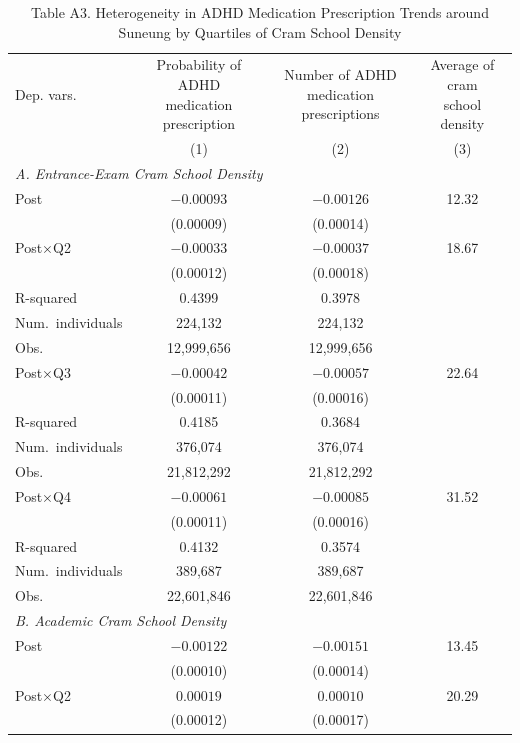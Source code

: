 \documentclass[12pt]{article}
\begin{document}
\clearpage
\begin{table}[H]
\centering
\caption{Table A3. Heterogeneity in ADHD Medication Prescription Trends around Suneung by Quartiles of Cram School Density}
\footnotesize\renewcommand{\arraystretch}{0.95}\setlength{\tabcolsep}{5pt}
\begin{tabular}{lccc}
\toprule
Dep. vars. & \shortstack{Probability of ADHD\\medication prescription} & \shortstack{Number of ADHD\\medication prescriptions} & \shortstack{Average of cram\\school density} \\
 & (1) & (2) & (3) \\
\midrule
\multicolumn{4}{l}{\textit{A. Entrance-Exam Cram School Density}} \\
Post & $-0.00093$ & $-0.00126$ & 12.32 \\
 & (0.00009) & (0.00014) & \\
Post$\times$Q2 & $-0.00033$ & $-0.00037$ & 18.67 \\
 & (0.00012) & (0.00018) & \\
R-squared & 0.4399 & 0.3978 & \\
Num.\ individuals & 224,132 & 224,132 & \\
Obs. & 12,999,656 & 12,999,656 & \\
\addlinespace
Post$\times$Q3 & $-0.00042$ & $-0.00057$ & 22.64 \\
 & (0.00011) & (0.00016) & \\
R-squared & 0.4185 & 0.3684 & \\
Num.\ individuals & 376,074 & 376,074 & \\
Obs. & 21,812,292 & 21,812,292 & \\
\addlinespace
Post$\times$Q4 & $-0.00061$ & $-0.00085$ & 31.52 \\
 & (0.00011) & (0.00016) & \\
R-squared & 0.4132 & 0.3574 & \\
Num.\ individuals & 389,687 & 389,687 & \\
Obs. & 22,601,846 & 22,601,846 & \\
\midrule
\multicolumn{4}{l}{\textit{B. Academic Cram School Density}} \\
Post & $-0.00122$ & $-0.00151$ & 13.45 \\
 & (0.00010) & (0.00014) & \\
Post$\times$Q2 & $0.00019$ & $0.00010$ & 20.29 \\
 & (0.00012) & (0.00017) & \\

\end{tabular}
\end{table}
\end{document}
